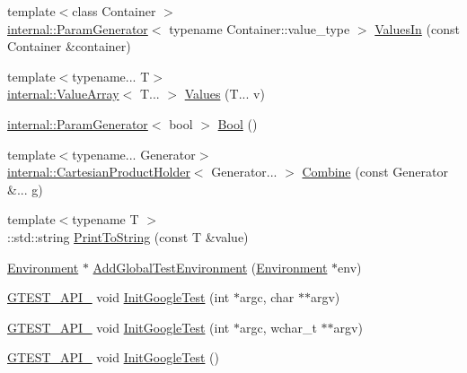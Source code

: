\begin{DoxyCompactItemize}
\item 
{\footnotesize template$<$class Container $>$ }\\\hyperlink{classtesting_1_1internal_1_1ParamGenerator}{internal\+::\+Param\+Generator}$<$ typename Container\+::value\+\_\+type $>$ \hyperlink{namespacetesting_aa67d0c8470c5f69fcfcacc9e775fa982}{Values\+In} (const Container \&container)
\item 
{\footnotesize template$<$typename... T$>$ }\\\hyperlink{classtesting_1_1internal_1_1ValueArray}{internal\+::\+Value\+Array}$<$ T... $>$ \hyperlink{namespacetesting_a374d4e5fbb4c938058fbe81d4c7ff6a6}{Values} (T... v)
\item 
\hyperlink{classtesting_1_1internal_1_1ParamGenerator}{internal\+::\+Param\+Generator}$<$ bool $>$ \hyperlink{namespacetesting_aa9f9150ed43f949c8a6bacf3f04c03ce}{Bool} ()
\item 
{\footnotesize template$<$typename... Generator$>$ }\\\hyperlink{classtesting_1_1internal_1_1CartesianProductHolder}{internal\+::\+Cartesian\+Product\+Holder}$<$ Generator... $>$ \hyperlink{namespacetesting_a2cb3b8fe262f59bf150998eb8fd0752d}{Combine} (const Generator \&... g)
\item 
{\footnotesize template$<$typename T $>$ }\\\+::std\+::string \hyperlink{namespacetesting_aa5717bb1144edd1d262d310ba70c82ed}{Print\+To\+String} (const T \&value)
\item 
\hyperlink{classtesting_1_1Environment}{Environment} $\ast$ \hyperlink{namespacetesting_a460d7b998622e332392c1e00be3a60d5}{Add\+Global\+Test\+Environment} (\hyperlink{classtesting_1_1Environment}{Environment} $\ast$env)
\item 
\hyperlink{gtest-port_8h_aa73be6f0ba4a7456180a94904ce17790}{G\+T\+E\+S\+T\+\_\+\+A\+P\+I\+\_\+} void \hyperlink{namespacetesting_aee3f6f99df893f576f705f66c0559482}{Init\+Google\+Test} (int $\ast$argc, char $\ast$$\ast$argv)
\item 
\hyperlink{gtest-port_8h_aa73be6f0ba4a7456180a94904ce17790}{G\+T\+E\+S\+T\+\_\+\+A\+P\+I\+\_\+} void \hyperlink{namespacetesting_a6e9d83553f1d10818d698d45689d8adb}{Init\+Google\+Test} (int $\ast$argc, wchar\+\_\+t $\ast$$\ast$argv)
\item 
\hyperlink{gtest-port_8h_aa73be6f0ba4a7456180a94904ce17790}{G\+T\+E\+S\+T\+\_\+\+A\+P\+I\+\_\+} void \hyperlink{namespacetesting_a2201e3fba11205a7edc2418fae82523e}{Init\+Google\+Test} ()
\item 

\end{DoxyCompactItemize}
